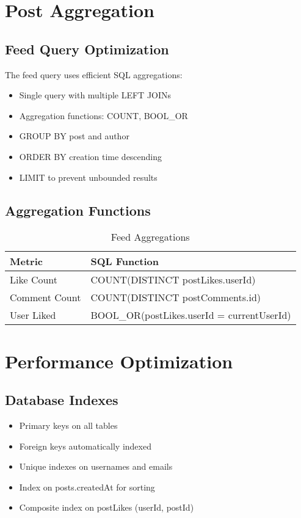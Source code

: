 \documentclass[12pt,a4paper]{report}
\begin{document}
\section{Post Aggregation}

\subsection{Feed Query Optimization}

The feed query uses efficient SQL aggregations:

\begin{itemize}
    \item Single query with multiple LEFT JOINs
    \item Aggregation functions: COUNT, BOOL\_OR
    \item GROUP BY post and author
    \item ORDER BY creation time descending
    \item LIMIT to prevent unbounded results
\end{itemize}

\subsection{Aggregation Functions}

\begin{table}[H]
\centering
\caption{Feed Aggregations}
\begin{tabular}{@{}ll@{}}
\toprule
\textbf{Metric} & \textbf{SQL Function} \\ \midrule
Like Count & COUNT(DISTINCT postLikes.userId) \\
Comment Count & COUNT(DISTINCT postComments.id) \\
User Liked & BOOL\_OR(postLikes.userId = currentUserId) \\ \bottomrule
\end{tabular}
\end{table}

\section{Performance Optimization}

\subsection{Database Indexes}

\begin{itemize}
    \item Primary keys on all tables
    \item Foreign keys automatically indexed
    \item Unique indexes on usernames and emails
    \item Index on posts.createdAt for sorting
    \item Composite index on postLikes (userId, postId)
\end{itemize}
\end{document}
